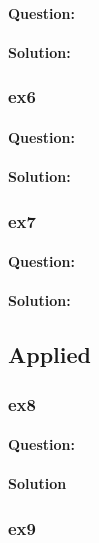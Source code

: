 \documentclass[a4paper,12pt,titlepage]{article} %
\begin{document}
\paragraph{Question:}

\paragraph{Solution:}

\subsubsection{ex6}
\paragraph{Question:}

\paragraph{Solution:}

\subsubsection{ex7}
\paragraph{Question:}

\paragraph{Solution:}


\subsection{Applied}
\subsubsection{ex8}
\paragraph{Question:}

\paragraph{Solution}

\subsubsection{ex9}
\end{document}
